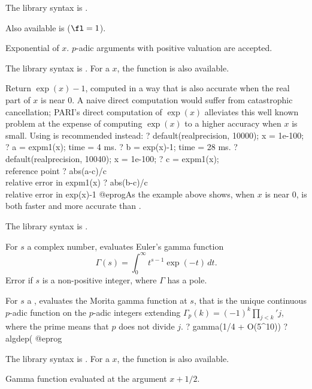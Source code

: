 The library syntax is .

Also available is  ($\fl=1$).

\label{se:exp}
Exponential of $x$.
$p$-adic arguments with positive valuation are accepted.

The library syntax is .
For a  $x$, the function
 is also available.

\label{se:expm1}
Return $\exp(x)-1$, computed in a way that is also accurate
when the real part of $x$ is near $0$.
A naive direct computation would suffer from catastrophic cancellation;
PARI's direct computation of $\exp(x)$ alleviates this well known problem at
the expense of computing $\exp(x)$ to a higher accuracy when $x$ is small.
Using  is recommended instead:
\bprog
? default(realprecision, 10000); x = 1e-100;
? a = expm1(x);
time = 4 ms.
? b = exp(x)-1;
time = 28 ms.
? default(realprecision, 10040); x = 1e-100;
? c = expm1(x);  \\ reference point
? abs(a-c)/c  \\ relative error in expm1(x)
? abs(b-c)/c  \\ relative error in exp(x)-1
@eprog\noindent As the example above shows, when $x$ is near $0$,
 is both faster and more accurate than .

The library syntax is .

\label{se:gamma}
For $s$ a complex number, evaluates Euler's gamma
function 
$$\Gamma(s)=\int_0^\infty t^{s-1}\exp(-t)\,dt.$$
Error if $s$ is a non-positive integer, where $\Gamma$ has a pole.

For $s$ a , evaluates the Morita gamma function at $s$, that
is the unique continuous $p$-adic function on the $p$-adic integers
extending $\Gamma_p(k)=(-1)^k \prod_{j<k}'j$, where the prime means that $p$
does not divide $j$.
\bprog
? gamma(1/4 + O(5^10))
? algdep(%
@eprog

The library syntax is .
For a  $x$, the function  is
also available.

\label{se:gammah}
Gamma function evaluated at the argument $x+1/2$.

